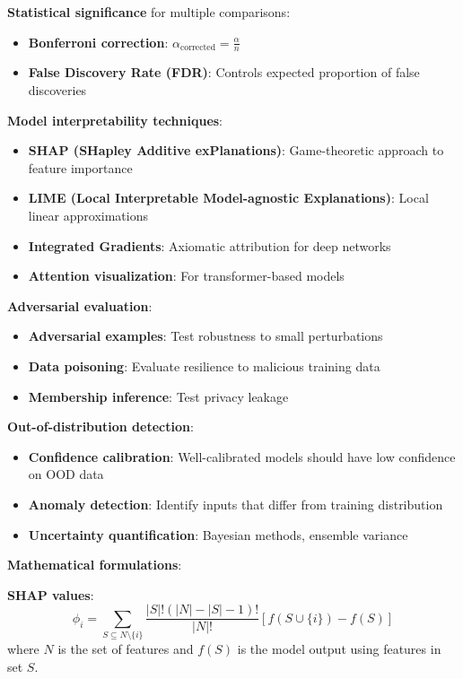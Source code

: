 \textbf{Statistical significance} for multiple comparisons:
\begin{itemize}
	\item \textbf{Bonferroni correction}: \(\alpha_{\text{corrected}} = \frac{\alpha}{n}\)
	\item \textbf{False Discovery Rate (FDR)}: Controls expected proportion of false discoveries
\end{itemize}

\textbf{Model interpretability techniques}:
\begin{itemize}
	\item \textbf{SHAP (SHapley Additive exPlanations)}: Game-theoretic approach to feature importance
	\item \textbf{LIME (Local Interpretable Model-agnostic Explanations)}: Local linear approximations
	\item \textbf{Integrated Gradients}: Axiomatic attribution for deep networks
	\item \textbf{Attention visualization}: For transformer-based models
\end{itemize}

\textbf{Adversarial evaluation}:
\begin{itemize}
	\item \textbf{Adversarial examples}: Test robustness to small perturbations
	\item \textbf{Data poisoning}: Evaluate resilience to malicious training data
	\item \textbf{Membership inference}: Test privacy leakage
\end{itemize}

\textbf{Out-of-distribution detection}:
\begin{itemize}
	\item \textbf{Confidence calibration}: Well-calibrated models should have low confidence on OOD data
	\item \textbf{Anomaly detection}: Identify inputs that differ from training distribution
	\item \textbf{Uncertainty quantification}: Bayesian methods, ensemble variance
\end{itemize}

\textbf{Mathematical formulations}:

\textbf{SHAP values}:
\[
\phi_i = \sum_{S \subseteq N \setminus \{i\}} \frac{|S|!(|N| - |S| - 1)!}{|N|!} [f(S \cup \{i\}) - f(S)]
\]
where \(N\) is the set of features and \(f(S)\) is the model output using features in set \(S\).

